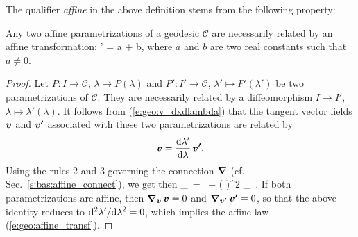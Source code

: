 The qualifier \emph{affine} in the above definition stems from the following
property:
\begin{greybox}
Any two affine parametrizations of a geodesic $\mathcal{C}$ are necessarily
related by an affine transformation:
\be \label{e:geo:affine_transf}
    \lambda' = a \lambda + b,
\ee
where $a$ and $b$ are two real constants such that $a\not = 0$.
\end{greybox}
\begin{proof}
Let $P: I \to  \mathcal{C}$, $\lambda\mapsto P(\lambda)$ and
$P': I'\to \mathcal{C}$,
$\lambda'\mapsto P'(\lambda')$ be two
parametrizations of $\mathcal{C}$. They are necessarily related by a
diffeomorphism $I\to I'$, $\lambda \mapsto \lambda'(\lambda)$. It follows
from (\ref{e:geo:v_dxdlambda}) that the tangent vector fields $\bm{v}$ and $\bm{v'}$
associated with these two parametrizations are related by
\[
    \bm{v} = \frac{\mathrm{d}\lambda'}{\mathrm{d}\lambda} \, \bm{v'} .
\]
Using the rules 2 and 3 governing the connection $\bm{\nabla}$ (cf. Sec.~\ref{s:bas:affine_connect}),
we get then
\be \label{e:geo:acc_v_acc_vp}
    \wnab_{}\, =  \, 
    + \left(  \right)^2 \wnab_{}\, .
\ee
If both parametrizations are affine, then $\bm{\nabla}_{\bm{v}}\,\bm{v} = 0$ and
$\bm{\nabla}_{\bm{v'}}\,\bm{v'} = 0$, so that the above identity reduces to
${\mathrm{d}^2\lambda'}/{\mathrm{d}\lambda^2} = 0$, which implies
the affine law (\ref{e:geo:affine_transf}).
\end{proof}

